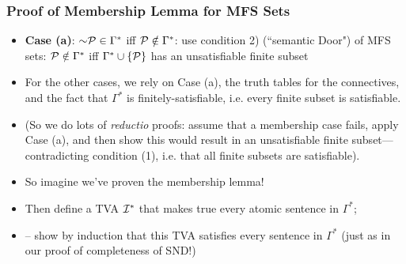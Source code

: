 \begin{frame}
\frametitle{Proof of Membership Lemma for MFS Sets}

\begin{itemize}[<+->]

\item \textbf{\textcolor{highlightB}{Case (a)}}: $\enot \metav{P} \in \Gamma^{\ast}$ iff $\mathcal{P} \notin \Gamma^{\ast}$: use condition 2) (``semantic Door") of MFS sets: $\mathcal{P} \notin \Gamma^{\ast}$ iff $\Gamma^{\ast} \cup \{\mathcal{P} \}$ has an unsatisfiable finite subset 

\item For the other cases, we rely on Case (a), the truth tables for the connectives, and the fact that $\Gamma^{\ast}$ is finitely-satisfiable, i.e. every finite subset is satisfiable. 

\item[] (So we do lots of \textit{reductio} proofs: assume that a membership case fails, apply Case (a), and then show this would result in an unsatisfiable finite subset---contradicting condition (1), i.e. that all finite subsets are satisfiable).  

\item So \textcolor{highlightB}{imagine we've proven the membership lemma!} 

\item Then define a TVA $\mathcal{I}^{\ast}$ that makes true every atomic sentence in $\Gamma^{\ast}$; 
\item[] -- show by induction that this TVA satisfies every sentence in $\Gamma^{\ast}$ (just as in our proof of completeness of SND!)

\end{itemize}
\end{frame}










\iffalse %

